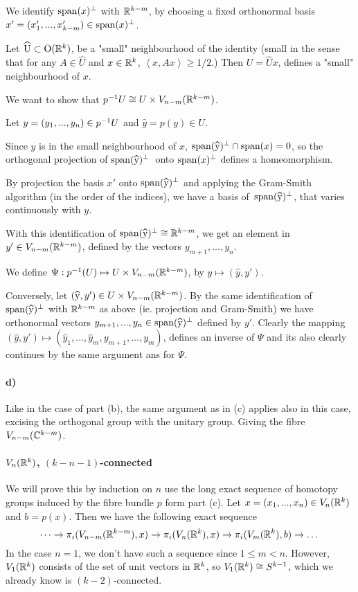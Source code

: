 \documentclass[a4paper,11pt,english]{article}
\newcommand{\orth}{\bot}
\begin{document}
\begin{exercise}[1]
We identify $\span(x)^\orth$ with $\mathbb{R}^{k-m}$, by choosing a fixed orthonormal
basis $x' = (x'_1, ..., x'_{k-m}) \in \span(x)^\orth$.

Let $\hat U \subset \O(\R^k)$, be a "small" neighbourhood of the identity (small
in the sense that for any $A \in \hat U$ and $x \in \mathbb{R}^k$, $\left<x, Ax\right>
\ge 1/2$.) Then $U = \hat Ux$, defines a "small" neighbourhood of $x$.

We want to show that $p^{-1} U \cong U \times V_{n-m}(\mathbb{R}^{k-m})$. 

Let $y = (y_1, ..., y_n) \in p^{-1} U$ and $\hat y = p(y) \in U$. 

Since $\hat y$ is in the small neighbourhood of $x$, $\span(\hat y)^\orth \cap
\span(x) = 0$, so the orthogonal projection of $\span(\hat y)^\orth$ onto
$\span(x)^\orth$ defines a homeomorphism. 

By projection the basis $x'$ onto $\span(\hat y)^\orth$ and applying the
Gram-Smith algorithm (in the order of the indices), we have a basis 
of $\span(\hat y)^\orth$, that varies continuously with $y$. 

With this identification of $\span(\hat y)^\orth \cong \R^{k-m}$, we get an
element in $y' \in V_{n-m}(\mathbb{R}^{k-m})$, defined by the vectors $y_{m+1}, ..., y_n$.

We define $\Psi : p^{-1}(U) \mapsto U \times V_{n-m}(\mathbb{R}^{k-m})$, by $y \mapsto
(\hat y, y')$.

Conversely, let $(\hat y, y') \in U \times V_{n-m}(\R^{k-m})$. By the same
identification of $\span(\hat y)^\orth$ with $\mathbb{R}^{k-m}$ as above (ie. projection
and Gram-Smith) we have orthonormal vectors $y_{m+1}, ..., y_n \in \span(\hat
y)^\orth$ defined by $y'$. Clearly the mapping $(\hat y, y') \mapsto (\hat y_1,
..., \hat y_m, y_{m+1}, ..., y_m)$, defines an inverse of $\Psi$ and its also
clearly continues by the same argument ans for $\Psi$.

\paragraph{d)}
Like in the case of part (b), the same argument as in (c) applies also in this
case, excising the orthogonal group with the unitary group. Giving the fibre
$V_{n-m}(\mathbb{C}^{k-m})$.


\paragraph{$V_n(\mathbb{R}^k)$, $(k-n-1)$-connected}
We will prove this by induction on $n$ use the long exact sequence of homotopy
groups induced by the fibre bundle $p$ form part (c). Let $x = (x_1,...,x_n) \in
V_n(\mathbb{R}^k)$ and $b = p(x)$. Then we have the following exact sequence
\[ \dots \to \pi_i(V_{n-m}(\mathbb{R}^{k-m}), x) \to \pi_i(V_n(\mathbb{R}^k), x) \to  \pi_i(V_m(\mathbb{R}^k),
b) \to \dots \]
In the case $n = 1$, we don't have such a sequence since $1 \le m < n$. However, 
$V_1(\mathbb{R}^k)$ consists of the set of unit vectors in $\mathbb{R}^k$, so $V_1(\mathbb{R}^k) \cong
S^{k-1}$, which we already know is $(k-2)$-connected.


\end{exercise}
\end{document}
